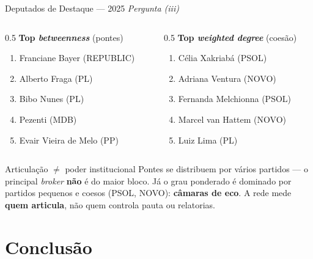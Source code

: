 \documentclass{beamer}
\begin{document}
\begin{frame}{Deputados de Destaque — 2025 \hfill {\footnotesize\textit{Pergunta (iii)}}}
\begin{columns}
\begin{column}{0.5\textwidth}
\footnotesize \textbf{Top \textit{betweenness}} (pontes)
\begin{enumerate}\footnotesize
  \item Franciane Bayer (REPUBLIC)
  \item Alberto Fraga (PL)
  \item Bibo Nunes (PL)
  \item Pezenti (MDB)
  \item Evair Vieira de Melo (PP)
\end{enumerate}
\end{column}
\begin{column}{0.5\textwidth}
\footnotesize \textbf{Top \textit{weighted degree}} (coesão)
\begin{enumerate}\footnotesize
  \item Célia Xakriabá (PSOL)
  \item Adriana Ventura (NOVO)
  \item Fernanda Melchionna (PSOL)
  \item Marcel van Hattem (NOVO)
  \item Luiz Lima (PL)
\end{enumerate}
\end{column}
\end{columns}

\vspace{0.2cm}
\begin{alertblock}{Articulação $\neq$ poder institucional}
Pontes se distribuem por vários partidos — o principal \textit{broker} \textbf{não} é do maior bloco. Já o grau ponderado é dominado por partidos pequenos e coesos (PSOL, NOVO): \textbf{câmaras de eco}. A rede mede \textbf{quem articula}, não quem controla pauta ou relatorias.
\end{alertblock}
\end{frame}

\section{Conclusão}
\end{document}
